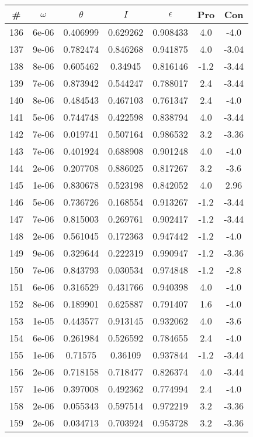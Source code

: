\begin{table}
\begin{tabular}{c|c|c|c|c|c|c}
\# & $\omega$ & $\theta$ & $I$ & $\epsilon$ & Pro & Con\\
\hline
136 & 6e-06 & 0.406999 & 0.629262 & 0.908433 & 4.0 & -4.0\\
137 & 9e-06 & 0.782474 & 0.846268 & 0.941875 & 4.0 & -3.04\\
138 & 8e-06 & 0.605462 & 0.34945 & 0.816146 & -1.2 & -3.44\\
139 & 7e-06 & 0.873942 & 0.544247 & 0.788017 & 2.4 & -3.44\\
140 & 8e-06 & 0.484543 & 0.467103 & 0.761347 & 2.4 & -4.0\\
141 & 5e-06 & 0.744748 & 0.422598 & 0.838794 & 4.0 & -3.44\\
142 & 7e-06 & 0.019741 & 0.507164 & 0.986532 & 3.2 & -3.36\\
143 & 7e-06 & 0.401924 & 0.688908 & 0.901248 & 4.0 & -4.0\\
144 & 2e-06 & 0.207708 & 0.886025 & 0.817267 & 3.2 & -3.6\\
145 & 1e-06 & 0.830678 & 0.523198 & 0.842052 & 4.0 & 2.96\\
146 & 5e-06 & 0.736726 & 0.168554 & 0.913267 & -1.2 & -3.44\\
147 & 7e-06 & 0.815003 & 0.269761 & 0.902417 & -1.2 & -3.44\\
148 & 2e-06 & 0.561045 & 0.172363 & 0.947442 & -1.2 & -4.0\\
149 & 9e-06 & 0.329644 & 0.222319 & 0.990947 & -1.2 & -3.36\\
150 & 7e-06 & 0.843793 & 0.030534 & 0.974848 & -1.2 & -2.8\\
151 & 6e-06 & 0.316529 & 0.431766 & 0.940398 & 4.0 & -4.0\\
152 & 8e-06 & 0.189901 & 0.625887 & 0.791407 & 1.6 & -4.0\\
153 & 1e-05 & 0.443577 & 0.913145 & 0.932062 & 4.0 & -3.6\\
154 & 6e-06 & 0.261984 & 0.526592 & 0.784655 & 2.4 & -4.0\\
155 & 1e-06 & 0.71575 & 0.36109 & 0.937844 & -1.2 & -3.44\\
156 & 2e-06 & 0.718158 & 0.718477 & 0.826374 & 4.0 & -3.44\\
157 & 1e-06 & 0.397008 & 0.492362 & 0.774994 & 2.4 & -4.0\\
158 & 2e-06 & 0.055343 & 0.597514 & 0.972219 & 3.2 & -3.36\\
159 & 2e-06 & 0.034713 & 0.703924 & 0.953728 & 3.2 & -3.36\\

\end{tabular}
\end{table}

